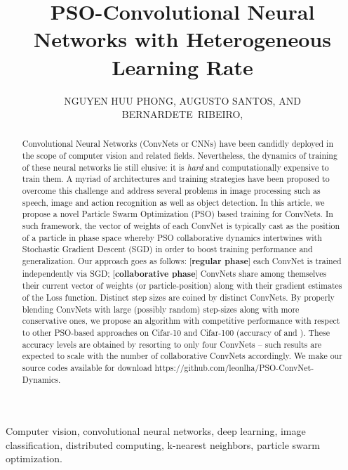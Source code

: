 \documentclass{ieeeaccess}
\begin{document}

\title{PSO-Convolutional Neural Networks with Heterogeneous Learning Rate}
\author{
\uppercase{Nguyen Huu Phong},
\uppercase{Augusto Santos, and Bernardete~Ribeiro},}
\address[1,2,3]{CISUC, Department of Informatics Engineering, University of Coimbra, Coimbra Portugal}




\begin{abstract}
 Convolutional Neural Networks (ConvNets or CNNs) have been candidly deployed in the scope of computer vision and related fields. Nevertheless, the dynamics of training of these neural networks lie still elusive: it is \emph{hard} and computationally expensive to train them. A myriad of architectures and training strategies have been proposed to overcome this challenge and address several problems in image processing such as speech, image and action recognition as well as object detection. In this article, we propose a novel Particle Swarm Optimization (PSO) based training for ConvNets. In such framework, the vector of weights of each ConvNet is typically cast as the position of a particle in phase space whereby PSO collaborative dynamics intertwines with Stochastic Gradient Descent (SGD) in order to boost training performance and generalization. Our approach goes as follows:  [\textbf{regular phase}] each ConvNet is trained independently via SGD;  [\textbf{collaborative phase}] ConvNets share among themselves their current vector of weights (or particle-position) along with their gradient estimates of the Loss function. Distinct step sizes are coined by distinct ConvNets. By properly blending ConvNets with large (possibly random) step-sizes along with more conservative ones, we propose an algorithm with competitive performance with respect to other PSO-based approaches on Cifar-10 and Cifar-100 (accuracy of  and ). These accuracy levels are obtained by resorting to only four ConvNets -- such results are expected to scale with the number of collaborative ConvNets accordingly. We make our source codes available for download https://github.com/leonlha/PSO-ConvNet-Dynamics.
\end{abstract}
\begin{IEEEkeywords}
Computer vision, convolutional neural networks, deep learning, image classification, distributed computing, k-nearest neighbors, particle swarm optimization.
\end{IEEEkeywords}
\titlepgskip=-15pt
\maketitle
\end{document}
